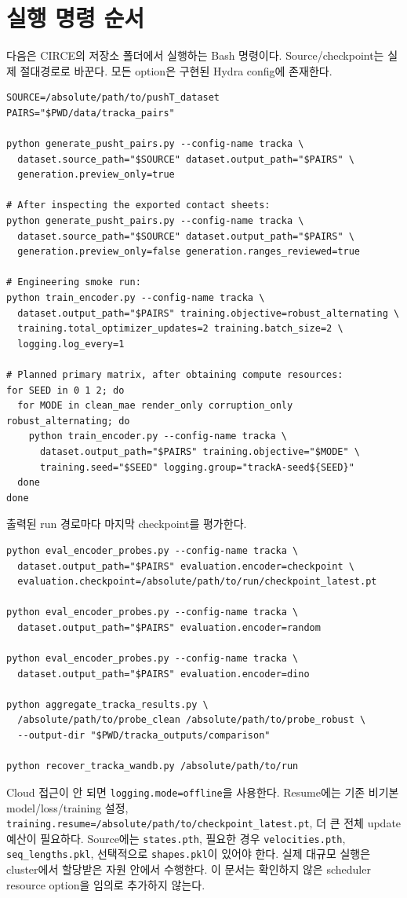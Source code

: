 \documentclass[11pt,a4paper]{article}
\newcommand{\code}[1]{\nolinkurl{#1}}
\begin{document}
\appendix
\section{실행 명령 순서}
다음은 CIRCE의 저장소 폴더에서 실행하는 Bash 명령이다. Source/checkpoint는
실제 절대경로로 바꾼다. 모든 option은 구현된 Hydra config에 존재한다.
\begin{lstlisting}
SOURCE=/absolute/path/to/pushT_dataset
PAIRS="$PWD/data/tracka_pairs"

python generate_pusht_pairs.py --config-name tracka \
  dataset.source_path="$SOURCE" dataset.output_path="$PAIRS" \
  generation.preview_only=true

# After inspecting the exported contact sheets:
python generate_pusht_pairs.py --config-name tracka \
  dataset.source_path="$SOURCE" dataset.output_path="$PAIRS" \
  generation.preview_only=false generation.ranges_reviewed=true

# Engineering smoke run:
python train_encoder.py --config-name tracka \
  dataset.output_path="$PAIRS" training.objective=robust_alternating \
  training.total_optimizer_updates=2 training.batch_size=2 \
  logging.log_every=1

# Planned primary matrix, after obtaining compute resources:
for SEED in 0 1 2; do
  for MODE in clean_mae render_only corruption_only robust_alternating; do
    python train_encoder.py --config-name tracka \
      dataset.output_path="$PAIRS" training.objective="$MODE" \
      training.seed="$SEED" logging.group="trackA-seed${SEED}"
  done
done
\end{lstlisting}
출력된 run 경로마다 마지막 checkpoint를 평가한다.
\begin{lstlisting}
python eval_encoder_probes.py --config-name tracka \
  dataset.output_path="$PAIRS" evaluation.encoder=checkpoint \
  evaluation.checkpoint=/absolute/path/to/run/checkpoint_latest.pt

python eval_encoder_probes.py --config-name tracka \
  dataset.output_path="$PAIRS" evaluation.encoder=random

python eval_encoder_probes.py --config-name tracka \
  dataset.output_path="$PAIRS" evaluation.encoder=dino

python aggregate_tracka_results.py \
  /absolute/path/to/probe_clean /absolute/path/to/probe_robust \
  --output-dir "$PWD/tracka_outputs/comparison"

python recover_tracka_wandb.py /absolute/path/to/run
\end{lstlisting}
Cloud 접근이 안 되면 \code{logging.mode=offline}을 사용한다.
Resume에는 기존 비기본 model/loss/training 설정,
\code{training.resume=/absolute/path/to/checkpoint_latest.pt},
더 큰 전체 update 예산이 필요하다.
Source에는 \code{states.pth}, 필요한 경우 \code{velocities.pth},
\code{seq_lengths.pkl}, 선택적으로 \code{shapes.pkl}이 있어야 한다.
실제 대규모 실행은 cluster에서 할당받은 자원 안에서 수행한다.
이 문서는 확인하지 않은 scheduler resource option을 임의로 추가하지 않는다.
\end{document}
